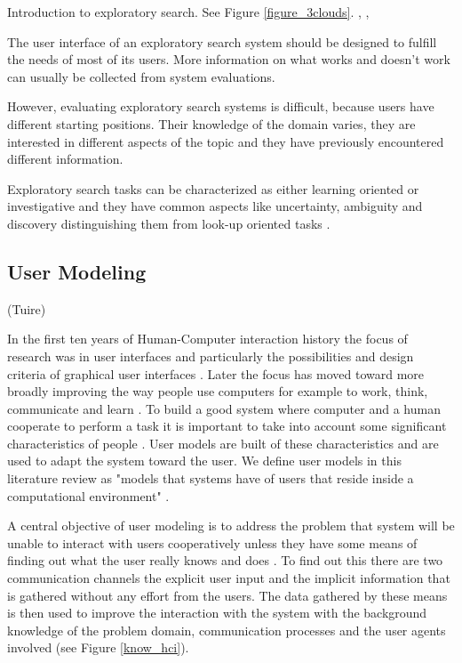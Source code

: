 \documentclass{sigchi}
\begin{document}
Introduction to exploratory search. See Figure \ref{figure_3clouds}.
\cite{march06}, \cite{white09}, \cite{tvaro11}



The user interface of an exploratory search system should be designed to fulfill the needs of most of its users. More information on what works and doesn't work can usually be collected from system evaluations.

However, evaluating exploratory search systems is difficult, because users have different starting positions. Their knowledge of the domain varies, they are interested in different aspects of the topic and they have previously encountered different information. \cite{kules08}

Exploratory search tasks can be characterized as either learning oriented or investigative  and they have common aspects like uncertainty, ambiguity and discovery distinguishing them from look-up oriented tasks \cite{kules09}.


\subsection{User Modeling}
(Tuire)

In the first ten years of Human-Computer interaction history the focus of research was in user interfaces and particularly the possibilities and design criteria of graphical user interfaces \cite{fischer01}. Later the focus has moved toward more broadly improving the way people use computers for example to work, think, communicate and learn \cite{fischer01}. To build a good system where computer and a human cooperate to perform a task it is important to take into account some significant characteristics of people \cite{rich99}. User models are built of these characteristics and are used to adapt the system toward the user. We define user models in this literature review as "models that systems have of users that reside inside a computational environment" \cite{fischer01}.

A central objective of user modeling is to address the problem that system will be unable to interact with users cooperatively unless they have some means of finding out what the user really knows and does \cite{fischer01}. To find out this there are two communication channels the explicit user input and the implicit information that is gathered without any effort from the users. The data gathered by these means is then used to improve the interaction with the system with the background knowledge of the problem domain, communication processes and the user agents involved (see Figure \ref{know_hci}).
\end{document}
